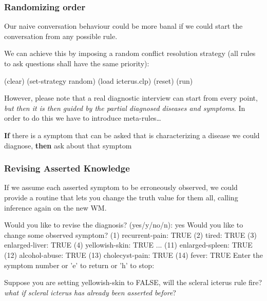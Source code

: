 \documentclass[xcolor={usenames,dvipsnames,svgnames}, compress]{beamer}
\begin{document}
\begin{frame}[fragile]
  \frametitle{Randomizing order}
  Our naive conversation behaviour could be more banal if we could
  start the conversation from any possible rule.\par\bigskip
  We can achieve this by imposing a random conflict resolution
  strategy (all rules to ask questions shall have the same priority):
  \begin{clips-code}
    (clear)
    (set-strategy random)
    (load icterus.clp)
    (reset)
    (run)
  \end{clips-code}

  However, please note that a real diagnostic interview can start from
  every point, \emph{but then it is then guided by
  the partial diagnosed diseases and symptoms}. In order to do this we
have to introduce meta-rules\dots\par\bigskip

  \textbf{If} there is a symptom that can be asked that is characterizing a
  disease we could diagnose, \textbf{then} ask about that symptom
\end{frame}

  

\begin{frame}[fragile]
  \frametitle{Revising Asserted Knowledge}
  If we assume each asserted symptom to be erroneously observed, we
  could provide a routine that lets you change the truth value for
  them all, calling inference again on the new WM.\par
  \begin{clips-code}
    Would you like to revise the diagnosis? (yes/y/no/n): yes
    Would you like to change some observed symptom?
    (1) recurrent-pain: TRUE
    (2) tired: TRUE
    (3) enlarged-liver: TRUE
    (4) yellowish-skin: TRUE
    ...
    (11) enlarged-spleen: TRUE
    (12) alcohol-abuse: TRUE
    (13) cholecyst-pain: TRUE
    (14) fever: TRUE
    Enter the symptom number or 'e' to return or 'h' to stop:
  \end{clips-code}

  Suppose you are setting yellowish-skin to FALSE, will the scleral
  icterus rule fire? \emph{what if scleral icterus has already been asserted before}? 
\end{frame}
\end{document}
